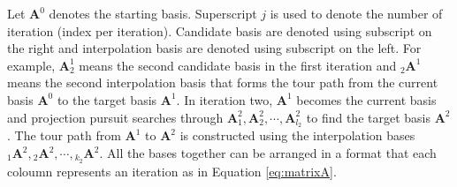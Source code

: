 \documentclass[12pt]{article}
\begin{document}
Let \(\mathbf{A}^0\) denotes the starting basis. Superscript \(j\) is
used to denote the number of iteration (index per iteration). Candidate
basis are denoted using subscript on the right and interpolation basis
are denoted using subscript on the left. For example,
\(\mathbf{A}^1_{2}\) means the second candidate basis in the first
iteration and \({}_{2}\mathbf{A}^1\) means the second interpolation
basis that forms the tour path from the current basis \(\mathbf{A}^0\)
to the target basis \(\mathbf{A}^1\). In iteration two, \(\mathbf{A}^1\)
becomes the current basis and projection pursuit searches through
\(\mathbf{A}^2_{1}, \mathbf{A}^2_{2}, \cdots, \mathbf{A}^2_{l_2}\) to
find the target basis \(\mathbf{A}^2\). The tour path from
\(\mathbf{A}^1\) to \(\mathbf{A}^2\) is constructed using the
interpolation bases
\({}_{1}\mathbf{A}^2, {}_{2}\mathbf{A}^2, \cdots, {}_{k_2}\mathbf{A}^2\).
All the bases together can be arranged in a format that each coloumn
represents an iteration as in Equation \ref{eq:matrixA}.
\end{document}
